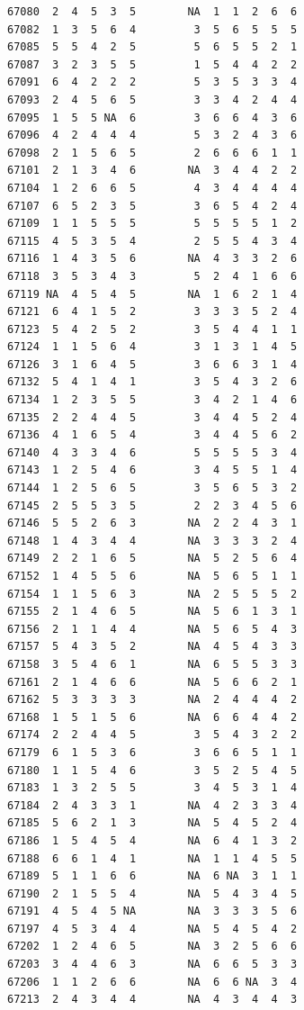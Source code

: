 \documentclass[
  letterpaper,
  DIV=11,
  numbers=noendperiod]{scrreprt}
\begin{document}
\begin{verbatim}
67080  2  4  5  3  5        NA  1  1  2  6  6
67082  1  3  5  6  4         3  5  6  5  5  5
67085  5  5  4  2  5         5  6  5  5  2  1
67087  3  2  3  5  5         1  5  4  4  2  2
67091  6  4  2  2  2         5  3  5  3  3  4
67093  2  4  5  6  5         3  3  4  2  4  4
67095  1  5  5 NA  6         3  6  6  4  3  6
67096  4  2  4  4  4         5  3  2  4  3  6
67098  2  1  5  6  5         2  6  6  6  1  1
67101  2  1  3  4  6        NA  3  4  4  2  2
67104  1  2  6  6  5         4  3  4  4  4  4
67107  6  5  2  3  5         3  6  5  4  2  4
67109  1  1  5  5  5         5  5  5  5  1  2
67115  4  5  3  5  4         2  5  5  4  3  4
67116  1  4  3  5  6        NA  4  3  3  2  6
67118  3  5  3  4  3         5  2  4  1  6  6
67119 NA  4  5  4  5        NA  1  6  2  1  4
67121  6  4  1  5  2         3  3  3  5  2  4
67123  5  4  2  5  2         3  5  4  4  1  1
67124  1  1  5  6  4         3  1  3  1  4  5
67126  3  1  6  4  5         3  6  6  3  1  4
67132  5  4  1  4  1         3  5  4  3  2  6
67134  1  2  3  5  5         3  4  2  1  4  6
67135  2  2  4  4  5         3  4  4  5  2  4
67136  4  1  6  5  4         3  4  4  5  6  2
67140  4  3  3  4  6         5  5  5  5  3  4
67143  1  2  5  4  6         3  4  5  5  1  4
67144  1  2  5  6  5         3  5  6  5  3  2
67145  2  5  5  3  5         2  2  3  4  5  6
67146  5  5  2  6  3        NA  2  2  4  3  1
67148  1  4  3  4  4        NA  3  3  3  2  4
67149  2  2  1  6  5        NA  5  2  5  6  4
67152  1  4  5  5  6        NA  5  6  5  1  1
67154  1  1  5  6  3        NA  2  5  5  5  2
67155  2  1  4  6  5        NA  5  6  1  3  1
67156  2  1  1  4  4        NA  5  6  5  4  3
67157  5  4  3  5  2        NA  4  5  4  3  3
67158  3  5  4  6  1        NA  6  5  5  3  3
67161  2  1  4  6  6        NA  5  6  6  2  1
67162  5  3  3  3  3        NA  2  4  4  4  2
67168  1  5  1  5  6        NA  6  6  4  4  2
67174  2  2  4  4  5         3  5  4  3  2  2
67179  6  1  5  3  6         3  6  6  5  1  1
67180  1  1  5  4  6         3  5  2  5  4  5
67183  1  3  2  5  5         3  4  5  3  1  4
67184  2  4  3  3  1        NA  4  2  3  3  4
67185  5  6  2  1  3        NA  5  4  5  2  4
67186  1  5  4  5  4        NA  6  4  1  3  2
67188  6  6  1  4  1        NA  1  1  4  5  5
67189  5  1  1  6  6        NA  6 NA  3  1  1
67190  2  1  5  5  4        NA  5  4  3  4  5
67191  4  5  4  5 NA        NA  3  3  3  5  6
67197  4  5  3  4  4        NA  5  4  5  4  2
67202  1  2  4  6  5        NA  3  2  5  6  6
67203  3  4  4  6  3        NA  6  6  5  3  3
67206  1  1  2  6  6        NA  6  6 NA  3  4
67213  2  4  3  4  4        NA  4  3  4  4  3

\end{verbatim}
\end{document}
